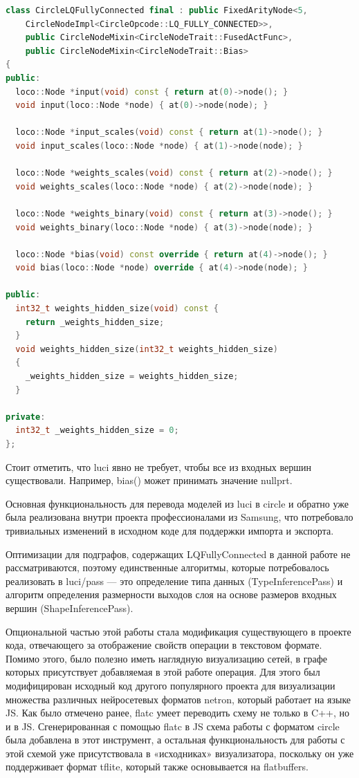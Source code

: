 \begin{lstlisting}[language=C++, caption={Структура слоя в luci}]
class CircleLQFullyConnected final : public FixedArityNode<5, 
    CircleNodeImpl<CircleOpcode::LQ_FULLY_CONNECTED>>,
    public CircleNodeMixin<CircleNodeTrait::FusedActFunc>,
    public CircleNodeMixin<CircleNodeTrait::Bias>
{
public:
  loco::Node *input(void) const { return at(0)->node(); }
  void input(loco::Node *node) { at(0)->node(node); }

  loco::Node *input_scales(void) const { return at(1)->node(); }
  void input_scales(loco::Node *node) { at(1)->node(node); }

  loco::Node *weights_scales(void) const { return at(2)->node(); }
  void weights_scales(loco::Node *node) { at(2)->node(node); }

  loco::Node *weights_binary(void) const { return at(3)->node(); }
  void weights_binary(loco::Node *node) { at(3)->node(node); }

  loco::Node *bias(void) const override { return at(4)->node(); }
  void bias(loco::Node *node) override { at(4)->node(node); }

public:
  int32_t weights_hidden_size(void) const { 
    return _weights_hidden_size; 
  }
  void weights_hidden_size(int32_t weights_hidden_size)
  {
    _weights_hidden_size = weights_hidden_size;
  }

private:
  int32_t _weights_hidden_size = 0;
};
\end{lstlisting}

Стоит отметить, что luci явно не требует, чтобы все из входных вершин существовали. Например, bias() может принимать значение nullprt. 

Основная функциональность для перевода моделей из luci в circle и обратно уже была реализована внутри проекта профессионалами из Samsung, что потребовало тривиальных изменений в исходном коде для поддержки импорта и экспорта.

Оптимизации для подграфов, содержащих LQFullyConnected в данной работе не рассматриваются, поэтому единственные алгоритмы, которые потребовалось реализовать в luci/pass — это определение типа данных (TypeInferencePass) и алгоритм определения размерности выходов слоя на основе размеров входных вершин (ShapeInferencePass).

Опциональной частью этой работы стала модификация существующего в проекте кода, отвечающего за отображение свойств операции в текстовом формате. Помимо этого, было полезно иметь наглядную визуализацию сетей, в графе которых присутствует добавляемая в этой работе операция. Для этого был модифицирован исходный код другого популярного проекта для визуализации множества различных нейросетевых форматов netron, который работает на языке JS. Как было отмечено ранее, flatc умеет переводить схему не только в C++, но и в JS. Сгенерированная с помощью flatc в JS схема работы с форматом circle была добавлена в этот инструмент, а остальная функциональность для работы с этой схемой уже присутствовала в «исходниках» визуализатора, поскольку он уже поддерживает формат tflite, который также основывается на flatbuffers.

